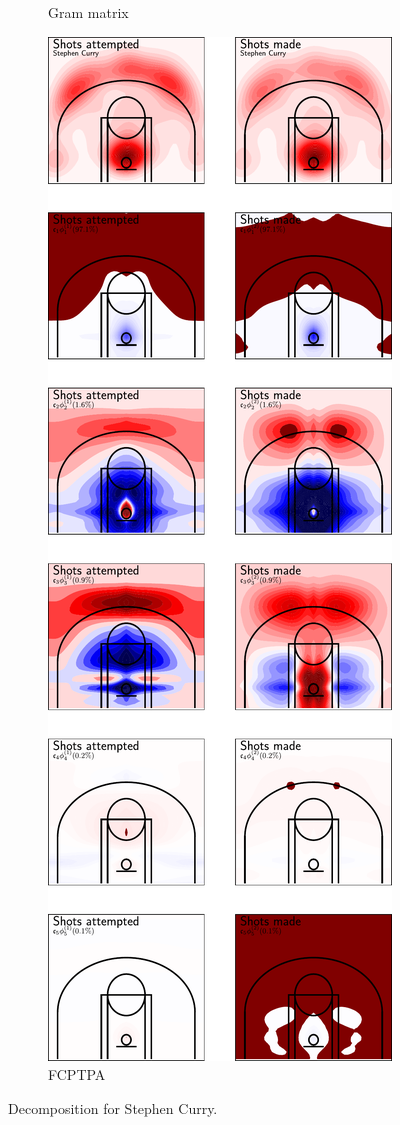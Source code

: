 \begin{figure}
\begin{subfigure}[b]{0.45\textwidth}
        \caption{Gram matrix}
        \label{fig:curry_decomposition}
    \end{subfigure}
    \hfill
    \begin{subfigure}[b]{0.45\textwidth}
        \centering
        \includegraphics[width=\textwidth]{figures/curry_decomposition_fcptpa.pdf}
        \caption{FCPTPA}
        \label{fig:curry_decomposition_fcptpa}
    \end{subfigure}
    \caption{Decomposition for Stephen Curry.}
    \label{fig:curry_shoots_decomposition}
\end{figure}
